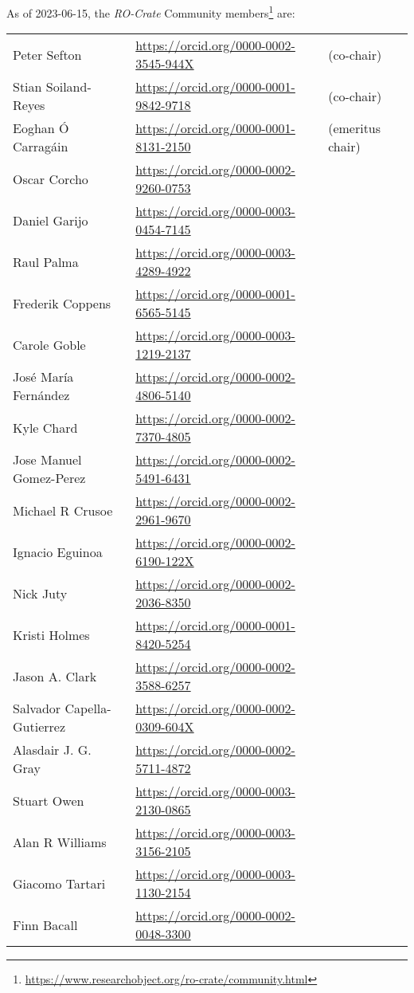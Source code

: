 As of 2023-06-15, the \emph{RO-Crate} Community members\footnote{\url{https://www.researchobject.org/ro-crate/community.html}} are:

\begin{longtable}{lll}
  Peter Sefton & \url{https://orcid.org/0000-0002-3545-944X} & (co-chair) 
\\
  Stian Soiland-Reyes & \url{https://orcid.org/0000-0001-9842-9718} & (co-chair) 
\\
  Eoghan Ó Carragáin & \url{https://orcid.org/0000-0001-8131-2150} & (emeritus chair) 
\\
  Oscar Corcho & \url{https://orcid.org/0000-0002-9260-0753}
\\
  Daniel Garijo & \url{https://orcid.org/0000-0003-0454-7145}
\\
  Raul Palma & \url{https://orcid.org/0000-0003-4289-4922}
\\
  Frederik Coppens & \url{https://orcid.org/0000-0001-6565-5145}
\\
  Carole Goble & \url{https://orcid.org/0000-0003-1219-2137}
\\
  José María Fernández & \url{https://orcid.org/0000-0002-4806-5140}
\\
  Kyle Chard & \url{https://orcid.org/0000-0002-7370-4805}
\\
  Jose Manuel Gomez-Perez & \url{https://orcid.org/0000-0002-5491-6431}
\\
  Michael R Crusoe & \url{https://orcid.org/0000-0002-2961-9670}
\\
  Ignacio Eguinoa & \url{https://orcid.org/0000-0002-6190-122X}
\\
  Nick Juty & \url{https://orcid.org/0000-0002-2036-8350}
\\
  Kristi Holmes & \url{https://orcid.org/0000-0001-8420-5254}
\\
  Jason A. Clark & \url{https://orcid.org/0000-0002-3588-6257}
\\
  Salvador Capella-Gutierrez & \url{https://orcid.org/0000-0002-0309-604X}
\\
  Alasdair J. G. Gray & \url{https://orcid.org/0000-0002-5711-4872}
\\
  Stuart Owen & \url{https://orcid.org/0000-0003-2130-0865}
\\
  Alan R Williams & \url{https://orcid.org/0000-0003-3156-2105}
\\
  Giacomo Tartari & \url{https://orcid.org/0000-0003-1130-2154}
\\
  Finn Bacall & \url{https://orcid.org/0000-0002-0048-3300}
\\

\end{longtable}
